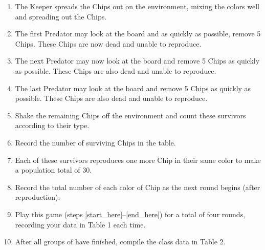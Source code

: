 \documentclass[12pt, addpoints, hidelinks]{exam}
\begin{document}
\begin{questions}
\begin{enumerate}
\item
  The Keeper spreads the Chips out on the environment, mixing the colors
  well and spreading out the Chips.
  
\item
  The first Predator may look at the board and as quickly as possible,
  remove 5 Chips. These Chips are now dead and unable to reproduce.
  
\item
  The next Predator may now look at the board and remove 5 Chips as
  quickly as possible. These Chips are also dead and unable to reproduce.
  
\item
  The last Predator may look at the board and remove 5 Chips as quickly
  as possible. These Chips are also dead and unable to reproduce.
  
\item
  Shake the remaining Chips off the environment and count these
  survivors according to their type.
  
\item
  Record the number of surviving Chips in the table.
  
\item
  Each of these survivors reproduces one more Chip in their same color
  to make a population total of 30.
  
\item\label{end_here}
  Record the total number of each color of Chip as the next round begins
  (after reproduction).
  
\item
  Play this game (steps \ref{start_here}–\ref{end_here}) for a total of four rounds, recording
  your data in Table 1 each time.
  
\item After all groups of have finished, compile the class data in Table 2.
\end{enumerate}


\newpage


\end{questions}
\end{document}
